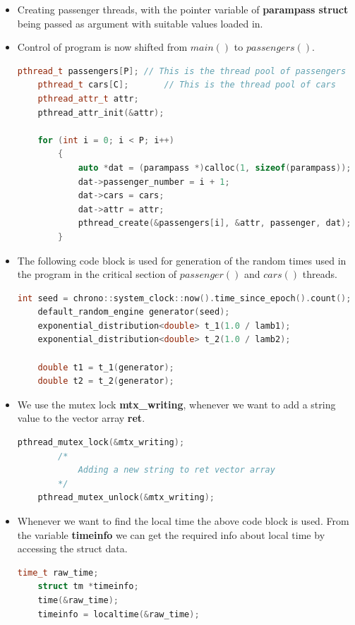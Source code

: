 \documentclass[12pt,a4paper]{article}
\begin{document}
\begin{itemize}
	\item Creating passenger threads, with the pointer variable of \textbf{parampass struct} being passed as argument with suitable values loaded in.
\item Control of program is now shifted from $main()$ to $passengers()$.
	\begin{lstlisting}[language=C++, style = mystyle]
	pthread_t passengers[P]; // This is the thread pool of passengers
	pthread_t cars[C];       // This is the thread pool of cars
	pthread_attr_t attr;
	pthread_attr_init(&attr);

	for (int i = 0; i < P; i++)
 		{
	   		auto *dat = (parampass *)calloc(1, sizeof(parampass));
	   		dat->passenger_number = i + 1;
	   		dat->cars = cars;
	   		dat->attr = attr;
	   		pthread_create(&passengers[i], &attr, passenger, dat);
    	}
\end{lstlisting}

	\item The following code block is used for generation of the random times used in the program in the critical section of $passenger()$ and $cars()$ threads.
	\begin{lstlisting}[language=C++, style = mystyle]
	int seed = chrono::system_clock::now().time_since_epoch().count();
    default_random_engine generator(seed);
    exponential_distribution<double> t_1(1.0 / lamb1);
    exponential_distribution<double> t_2(1.0 / lamb2);

    double t1 = t_1(generator);
    double t2 = t_2(generator);
\end{lstlisting}

	\item We use the mutex lock \textbf{mtx\_writing}, whenever we want to add a string value to the vector array \textbf{ret}.
		\begin{lstlisting}[language=C++, style = mystyle]
	pthread_mutex_lock(&mtx_writing);
		/*
			Adding a new string to ret vector array
		*/
	pthread_mutex_unlock(&mtx_writing);
	\end{lstlisting}
	
	\item Whenever we want to find the local time the above code block is used. From the variable \textbf{timeinfo} we can get the required info about local time by accessing the struct data. 
		\begin{lstlisting}[language=C++, style = mystyle]
	time_t raw_time;
	struct tm *timeinfo;
  	time(&raw_time);
	timeinfo = localtime(&raw_time);
\end{lstlisting}


\end{itemize}
\end{document}
